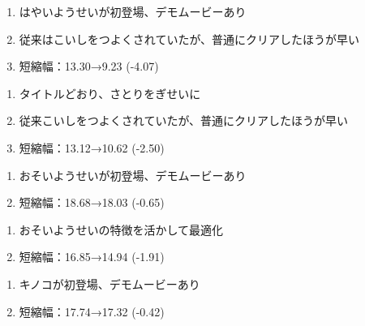 \begin{enumerate}[label={\sarrow}]
\item はやいようせいが初登場、デモムービーあり
\item 従来はこいしをつよくされていたが、普通にクリアしたほうが早い
\item 短縮幅：13.30→9.23 (-4.07)
\end{enumerate}



\begin{enumerate}[label={\sarrow}]
\item タイトルどおり、さとりをぎせいに
\item 従来こいしをつよくされていたが、普通にクリアしたほうが早い
\item 短縮幅：13.12→10.62 (-2.50)
\end{enumerate}



\begin{enumerate}[label={\sarrow}]
\item おそいようせいが初登場、デモムービーあり
\item 短縮幅：18.68→18.03 (-0.65)
\end{enumerate}



\begin{enumerate}[label={\sarrow}]
\item おそいようせいの特徴を活かして最適化
\item 短縮幅：16.85→14.94 (-1.91)
\end{enumerate}



\begin{enumerate}[label={\sarrow}]
\item キノコが初登場、デモムービーあり
\item 短縮幅：17.74→17.32 (-0.42)
\end{enumerate}



